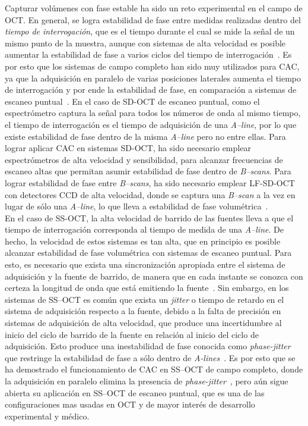 \documentclass[letter, 12 pt]{article}
\begin{document}
Capturar volúmenes con fase estable ha sido un reto experimental en el campo de OCT. En general, se logra estabilidad de fase entre medidas realizadas dentro del \textit{tiempo de interrogación}, que es el tiempo durante el cual se mide la señal de un mismo punto de la muestra, aunque con sistemas de alta velocidad es posible aumentar la estabilidad de fase a varios ciclos del tiempo de interrogación~\cite{Shemonski2014_Stability}. Es por esto que los sistemas de campo completo han sido muy utilizados para CAC, ya que la adquisición en paralelo de varias posiciones laterales aumenta el tiempo de interrogación y por ende la estabilidad de fase, en comparación a sistemas de escaneo puntual~\cite{South2015_Computed}. En el caso de SD-OCT de escaneo puntual, como el espectrómetro captura la señal para todos los números de onda al mismo tiempo, el tiempo de interrogación es el tiempo de adquisición de una \textit{A--line}, por lo que existe estabilidad de fase dentro de la misma \textit{A--line} pero no entre ellas. Para lograr aplicar CAC en sistemas SD-OCT, ha sido necesario emplear espectrómetros de alta velocidad y sensibilidad, para alcanzar frecuencias de escaneo altas que permitan asumir estabilidad de fase dentro de \textit{B--scans}. Para lograr estabilidad de fase entre \textit{B--scans}, ha sido necesario emplear LF-SD-OCT con detectores CCD de alta velocidad, donde se captura una \textit{B--scan} a la vez en lugar de sólo una \textit{A--line}, lo que lleva a estabilidad de fase volumétrica~\cite{Ginner2018_Holographic}. \\

En el caso de SS-OCT, la alta velocidad de barrido de las fuentes lleva a que el tiempo de interrogación corresponda al tiempo de medida de una \textit{A--line}. De hecho, la velocidad de estos sistemas es tan alta, que en principio es posible alcanzar estabilidad de fase volumétrica con sistemas de escaneo puntual. Para esto, es necesario que exista una sincronización apropiada entre el sistema de adquisición y la fuente de barrido, de manera que en cada instante se conozca con certeza la longitud de onda que está emitiendo la fuente~\cite{Vakoc2005_Phase}. Sin embargo, en los sistemas de SS--OCT es común que exista un \textit{jitter} o tiempo de retardo en el sistema de adquisición respecto a la fuente, debido a la falta de precisión en sistemas de adquisición de alta velocidad, que produce una incertidumbre al inicio del ciclo de barrido de la fuente en relación al inicio del ciclo de adquisición. Esto produce una inestabilidad de fase conocida como \textit{phase-jitter} que restringe la estabilidad de fase a sólo dentro de \textit{A-lines}~\cite{Vakoc2005_Phase}. Es por esto que se ha demostrado el funcionamiento de CAC en SS--OCT de campo completo, donde la adquisición en paralelo elimina la presencia de \textit{phase-jitter}~\cite{kumar2013, hillmann2016}, pero aún sigue abierta su aplicación en SS--OCT de escaneo puntual, que es una de las configuraciones mas usadas en OCT y de mayor interés de desarrollo experimental y médico.
\end{document}
